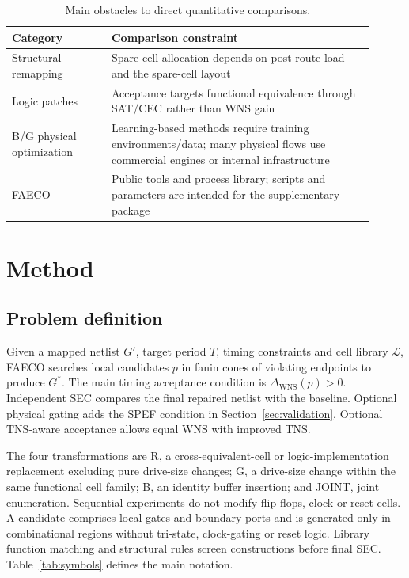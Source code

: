 \documentclass[preprint,12pt]{elsarticle}
\begin{document}
\begin{table}[htbp]
\centering\small
\caption{Main obstacles to direct quantitative comparisons.}\label{tab:baseline_cmp}
\begin{tabular}{p{0.25\linewidth}p{0.66\linewidth}}\toprule
Category & Comparison constraint\\\midrule
Structural remapping & Spare-cell allocation depends on post-route load and the spare-cell layout\\
Logic patches & Acceptance targets functional equivalence through SAT/CEC rather than WNS gain\\
B/G physical optimization & Learning-based methods require training environments/data; many physical flows use commercial engines or internal infrastructure\\
FAECO & Public tools and process library; scripts and parameters are intended for the supplementary package\\\bottomrule
\end{tabular}
\end{table}

\section{Method}
\subsection{Problem definition}
Given a mapped netlist $G'$, target period $T$, timing constraints and cell library $\mathcal L$, FAECO searches local candidates $p$ in fanin cones of violating endpoints to produce $G^*$. The main timing acceptance condition is $\Delta_{\mathrm{WNS}}(p)>0$. Independent SEC compares the final repaired netlist with the baseline. Optional physical gating adds the SPEF condition in Section~\ref{sec:validation}. Optional TNS-aware acceptance allows equal WNS with improved TNS.

The four transformations are R, a cross-equivalent-cell or logic-implementation replacement excluding pure drive-size changes; G, a drive-size change within the same functional cell family; B, an identity buffer insertion; and JOINT, joint enumeration. Sequential experiments do not modify flip-flops, clock or reset cells. A candidate comprises local gates and boundary ports and is generated only in combinational regions without tri-state, clock-gating or reset logic. Library function matching and structural rules screen constructions before final SEC. Table~\ref{tab:symbols} defines the main notation.
\end{document}

